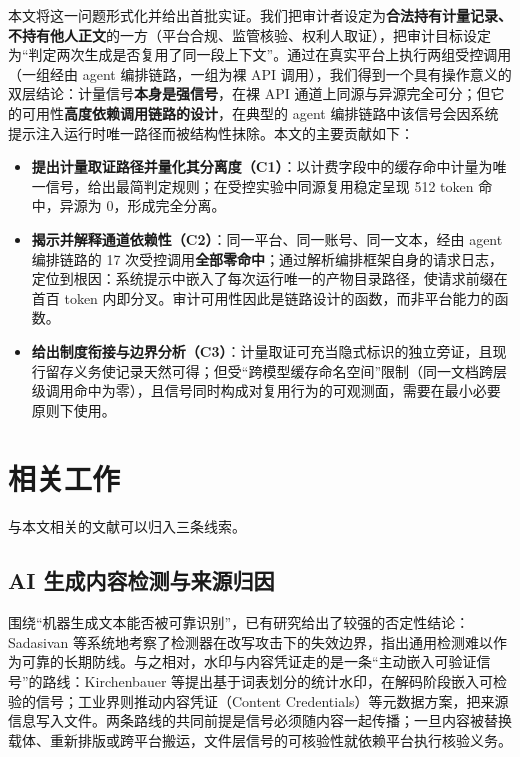 \documentclass[11pt, a4paper]{ctexart}
\begin{document}
本文将这一问题形式化并给出首批实证。我们把审计者设定为\textbf{合法持有计量记录、不持有他人正文}的一方（平台合规、监管核验、权利人取证），把审计目标设定为“判定两次生成是否复用了同一段上下文”。通过在真实平台上执行两组受控调用（一组经由 agent 编排链路，一组为裸 API 调用），我们得到一个具有操作意义的双层结论：计量信号\textbf{本身是强信号}，在裸 API 通道上同源与异源完全可分；但它的可用性\textbf{高度依赖调用链路的设计}，在典型的 agent 编排链路中该信号会因系统提示注入运行时唯一路径而被结构性抹除。本文的主要贡献如下：

\begin{itemize}
\item \textbf{提出计量取证路径并量化其分离度（C1）}：以计费字段中的缓存命中计量为唯一信号，给出最简判定规则；在受控实验中同源复用稳定呈现 512 token 命中，异源为 0，形成完全分离。
\item \textbf{揭示并解释通道依赖性（C2）}：同一平台、同一账号、同一文本，经由 agent 编排链路的 17 次受控调用\textbf{全部零命中}；通过解析编排框架自身的请求日志，定位到根因：系统提示中嵌入了每次运行唯一的产物目录路径，使请求前缀在首百 token 内即分叉。审计可用性因此是链路设计的函数，而非平台能力的函数。
\item \textbf{给出制度衔接与边界分析（C3）}：计量取证可充当隐式标识的独立旁证，且现行留存义务使记录天然可得；但受“跨模型缓存命名空间”限制（同一文档跨层级调用命中为零），且信号同时构成对复用行为的可观测面，需要在最小必要原则下使用。
\end{itemize}

\section{相关工作}
\label{sec:related}

与本文相关的文献可以归入三条线索。

\subsection{AI 生成内容检测与来源归因}
围绕“机器生成文本能否被可靠识别”，已有研究给出了较强的否定性结论：Sadasivan 等系统地考察了检测器在改写攻击下的失效边界，指出通用检测难以作为可靠的长期防线\cite{sadasivan2025tmlr}。与之相对，水印与内容凭证走的是一条“主动嵌入可验证信号”的路线：Kirchenbauer 等提出基于词表划分的统计水印，在解码阶段嵌入可检验的信号\cite{kirchenbauer2023watermark}；工业界则推动内容凭证（Content Credentials）等元数据方案，把来源信息写入文件。两条路线的共同前提是信号必须随内容一起传播；一旦内容被替换载体、重新排版或跨平台搬运，文件层信号的可核验性就依赖平台执行核验义务。
\end{document}

